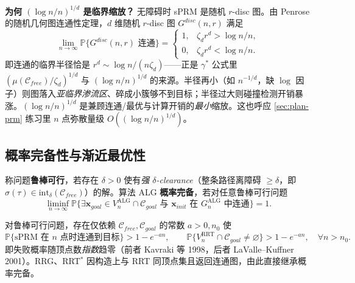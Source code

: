 \begin{insight}
\textbf{为何 $(\log n/n)^{1/d}$ 是临界缩放？}\;
无障碍时 sPRM 是随机 $r$-disc 图。由 Penrose 的随机几何图连通性定理，$d$ 维随机 $r$-disc 图 $G^{disc}(n,r)$ 满足
\[
  \lim_{n\to\infty}\mathbb{P}\{G^{disc}(n,r)\text{ 连通}\}=\begin{cases}1,&\zeta_d r^d>\log n/n,\\0,&\zeta_d r^d<\log n/n.\end{cases}
\]
即连通的临界半径恰是 $r^d\sim\log n/(n\zeta_d)$——正是 $\gamma^*$ 公式里 $(\mu(\mathcal{C}_{free})/\zeta_d)^{1/d}$ 与 $(\log n/n)^{1/d}$ 的来源。半径再小（如 $n^{-1/d}$，缺 $\log$ 因子）则图落入\emph{亚临界渗流区}、碎成小簇够不到目标；半径过大则碰撞检测开销暴涨。$(\log n/n)^{1/d}$ 是兼顾连通/最优与计算开销的\emph{最小}缩放。这也呼应 \cref{sec:plan-prm} 练习里 $n$ 点弥散量级 $O((\log n/n)^{1/d})$。
\end{insight}

\subsection{概率完备性与渐近最优性}
\label{sec:plan-aotheory}

\begin{definition}[概率完备性]\label{def:plan-probcomplete}
称问题\textbf{鲁棒可行}，若存在 $\delta>0$ 使有\emph{强 $\delta$-clearance}（整条路径离障碍 $\ge\delta$，即 $\sigma(\tau)\in\mathrm{int}_\delta(\mathcal{C}_{free})$）的解。算法 ALG \textbf{概率完备}，若对任意鲁棒可行问题
\begin{equation}
  \liminf_{n\to\infty}\mathbb{P}\{\exists\mathbf{x}_{goal}\in V_n^{\mathrm{ALG}}\cap\mathcal{C}_{goal}\text{ 与 }\mathbf{x}_{init}\text{ 在 }G_n^{\mathrm{ALG}}\text{ 中连通}\}=1.
  \label{eq:plan-probcomplete}
\end{equation}
\end{definition}

\begin{theorem}\label{thm:plan-pc}
对鲁棒可行问题，存在仅依赖 $\mathcal{C}_{free},\mathcal{C}_{goal}$ 的常数 $a>0,n_0$ 使
\[
  \mathbb{P}\{\text{sPRM 在 }n\text{ 点时连通到目标}\}>1-e^{-an},\qquad
  \mathbb{P}\{V_n^{\mathrm{RRT}}\cap\mathcal{C}_{goal}\ne\varnothing\}>1-e^{-an},\quad\forall n>n_0.
\]
即失败概率随顶点数\emph{指数}趋零（前者 Kavraki 等 1998，后者 LaValle--Kuffner 2001）。RRG、RRT$^*$ 因构造上与 RRT 同顶点集且返回连通图，由此直接继承概率完备。
\end{theorem}

